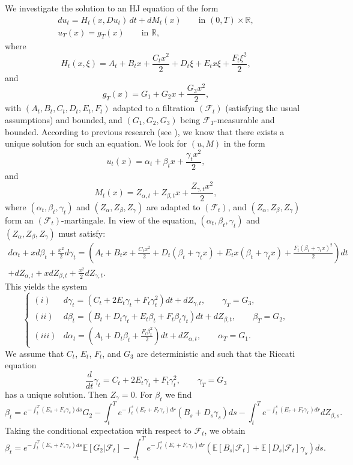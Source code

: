 \documentclass[10pt]{article}
\begin{document}
We investigate the solution to an HJ equation of the form 
\begin{equation}\label{HJexp}
\begin{array}{l}
du_t = H_t(x,Du_t)\, dt + dM_t(x)\qquad \text{in } (0,T)\times \mathbb{R}, \\
u_T(x) = g_T(x) \qquad \text{in } \mathbb{R},
\end{array}
\end{equation}
where 
\begin{equation}\label{notgenH}
H_t(x,\xi) = A_t + B_t x + \frac{C_t x^2}{2} + D_t \xi + E_t x\xi + \frac{F_t \xi^2}{2},
\end{equation}
and 
$$
g_T(x) = G_1 + G_2x + \frac{G_3x^2}{2},
$$
with $(A_t,B_t,C_t,D_t,E_t,F_t)$ adapted to a filtration $(\mathcal{F}_t)$ (satisfying the usual assumptions) and bounded, and $(G_1, G_2, G_3)$ being $\mathcal{F}_T$-measurable and bounded. According to previous research (see \citeauthor{bismut1976linear} \cite{bismut1976linear}), we know that there exists a unique solution for such an equation. We look for $(u, M)$ in the form 
$$
u_t(x) = \alpha_t + \beta_t x + \frac{\gamma_t x^2}{2},
$$
and 
$$
M_t(x) = Z_{\alpha,t} + Z_{\beta,t} x + \frac{Z_{\gamma,t} x^2}{2},
$$
where $(\alpha_t, \beta_t, \gamma_t)$ and $(Z_\alpha, Z_\beta, Z_\gamma)$ are adapted to $(\mathcal{F}_t)$, and $(Z_\alpha, Z_\beta, Z_\gamma)$ form an $(\mathcal{F}_t)$-martingale. In view of the equation, $(\alpha_t, \beta_t, \gamma_t)$ and $(Z_\alpha, Z_\beta, Z_\gamma)$ must satisfy: 
\begin{align*}
d\alpha_t + x d\beta_t + \frac{x^2}{2} d\gamma_t = \left( A_t + B_t x + \frac{C_t x^2}{2} + D_t(\beta_t + \gamma_t x) + E_t x(\beta_t + \gamma_t x) + \frac{F_t (\beta_t + \gamma_t x)^2}{2} \right) dt \\
+ dZ_{\alpha,t} + x dZ_{\beta,t} + \frac{x^2}{2} dZ_{\gamma,t}.
\end{align*}
This yields the system 
$$
\left\{
\begin{array}{ll}
(i) & d\gamma_t = \left(C_t + 2E_t \gamma_t + F_t \gamma_t^2 \right) dt + dZ_{\gamma,t}, \qquad \gamma_T = G_3,\\ 
(ii) & d\beta_t = \left( B_t + D_t \gamma_t + E_t \beta_t + F_t \beta_t \gamma_t \right) dt + dZ_{\beta,t}, \qquad \beta_T = G_2,\\ 
(iii) & d\alpha_t = \left( A_t + D_t \beta_t + \frac{F_t \beta_t^2}{2} \right) dt + dZ_{\alpha,t}, \qquad \alpha_T = G_1.
\end{array}\right.
$$
We assume that $C_t$, $E_t$, $F_t$, and $G_3$ are deterministic and such that the Riccati equation 
$$
\frac{d}{dt} \gamma_t = C_t + 2E_t \gamma_t + F_t \gamma_t^2, \qquad  \gamma_T = G_3
$$
has a unique solution. Then $Z_\gamma = 0$. For $\beta_t$ we find 
$$
\beta_t = e^{-\int_t^T (E_s + F_s \gamma_s)ds} G_2 - \int_t^T e^{-\int_t^s (E_r + F_r \gamma_r)dr} (B_s + D_s \gamma_s) ds 
- \int_t^T e^{-\int_t^s (E_r + F_r \gamma_r)dr} dZ_{\beta,s}.
$$
Taking the conditional expectation with respect to $\mathcal{F}_t$, we obtain
$$
\beta_t = e^{-\int_t^T (E_s + F_s \gamma_s)ds} \mathbb{E}[G_2|\mathcal{F}_t] - \int_t^T e^{-\int_t^s (E_r + F_r \gamma_r)dr} \left( \mathbb{E}[B_s|\mathcal{F}_t] + \mathbb{E}[D_s|\mathcal{F}_t]\gamma_s \right) ds.
$$
\end{document}
